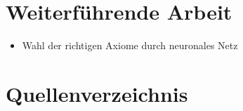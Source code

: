 \documentclass[german,version-2020-11]{uzl-thesis}
\begin{document}
\chapter{Weiterführende Arbeit}
\begin{itemize}
  \item Wahl der richtigen Axiome durch neuronales Netz
\end{itemize}
\chapter{Quellenverzeichnis}
\end{document}

